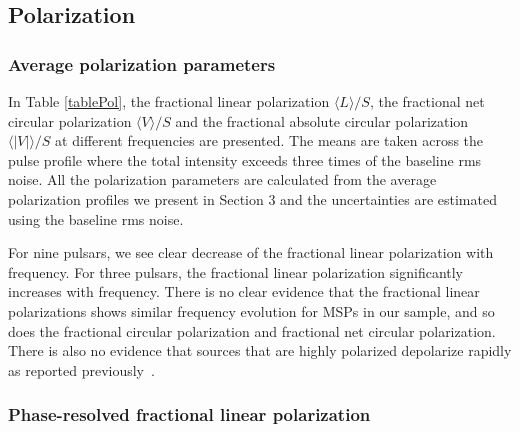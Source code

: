 \documentclass[useAMS,usenatbib]{mn2e}
\begin{document}
\subsection{Polarization}

\subsubsection{Average polarization parameters}

In Table \ref{tablePol}, the fractional linear polarization $\langle L \rangle/S$, 
the fractional net circular polarization $\langle V \rangle/S$ and the fractional absolute 
circular polarization $\langle|V|\rangle/S$ at different frequencies are presented. 
%
The means are taken across the pulse profile where the total intensity exceeds 
three times of the baseline rms noise.
%
All the polarization parameters are calculated from the average polarization 
profiles we present in Section $3$ and the uncertainties are estimated using 
the baseline rms noise. 
%
%

For nine pulsars, we see clear decrease of the fractional linear polarization 
with frequency. 
%
For three pulsars, the fractional linear polarization significantly increases 
with frequency. 
%
There is no clear evidence that the fractional linear polarizations shows 
similar frequency evolution for MSPs in our sample, and so does the fractional 
circular polarization and fractional net circular polarization. 
%
There is also no evidence that sources that are highly polarized depolarize rapidly
as reported previously~\citep{Kramer99}.
%

\subsubsection{Phase-resolved fractional linear polarization}
\end{document}
